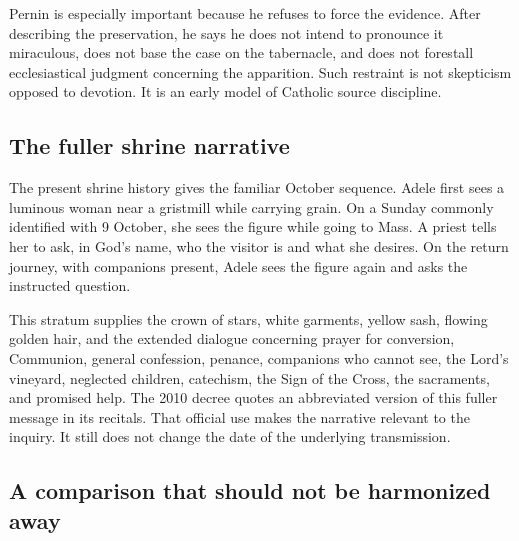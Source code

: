 Pernin is especially important because he refuses to force the evidence. After describing the preservation, he says he does not intend to pronounce it miraculous, does not base the case on the tabernacle, and does not forestall ecclesiastical judgment concerning the apparition. Such restraint is not skepticism opposed to devotion. It is an early model of Catholic source discipline.

\subsection{The fuller shrine narrative}

The present shrine history gives the familiar October sequence. Adele first sees a luminous woman near a gristmill while carrying grain. On a Sunday commonly identified with 9 October, she sees the figure while going to Mass. A priest tells her to ask, in God's name, who the visitor is and what she desires. On the return journey, with companions present, Adele sees the figure again and asks the instructed question.

This stratum supplies the crown of stars, white garments, yellow sash, flowing golden hair, and the extended dialogue concerning prayer for conversion, Communion, general confession, penance, companions who cannot see, the Lord's vineyard, neglected children, catechism, the Sign of the Cross, the sacraments, and promised help. The 2010 decree quotes an abbreviated version of this fuller message in its recitals. That official use makes the narrative relevant to the inquiry. It still does not change the date of the underlying transmission.

\subsection{A comparison that should not be harmonized away}

